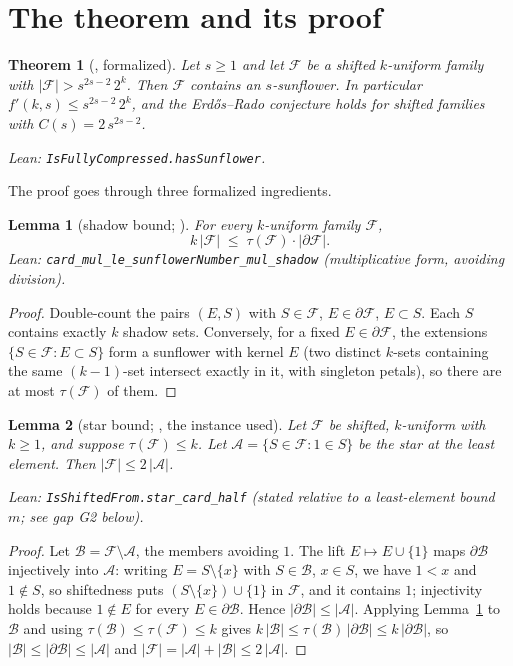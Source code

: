 \documentclass[11pt,a4paper]{article}
\newtheorem{theorem}{Theorem}
\newtheorem{lemma}{Lemma}
\theoremstyle{remark}
\newcommand{\cA}{\mathcal{A}}
\newcommand{\cB}{\mathcal{B}}
\newcommand{\cF}{\mathcal{F}}
\begin{document}
\section{The theorem and its proof}

\begin{theorem}[{\cite[Theorem~1 and Corollary~1]{Mi26}}, formalized]
\label{thm:main}
Let $s\ge 1$ and let $\cF$ be a shifted $k$-uniform family with
$|\cF|>s^{2s-2}\,2^{k}$. Then $\cF$ contains an $s$-sunflower. In
particular $f'(k,s)\le s^{2s-2}\,2^{k}$, and the Erd\H{o}s--Rado
conjecture holds for shifted families with $C(s)=2\,s^{2s-2}$.

\noindent\emph{Lean:} \texttt{IsFullyCompressed.hasSunflower}.
\end{theorem}

The proof goes through three formalized ingredients.

\begin{lemma}[shadow bound; {\cite[Lemma~4]{Mi26}}]\label{lem:shadow}
For every $k$-uniform family $\cF$,
\[
  k\,|\cF|\;\le\;\tau(\cF)\cdot|\partial\cF|.
\]
\emph{Lean:} \texttt{card\_mul\_le\_sunflowerNumber\_mul\_shadow}
(multiplicative form, avoiding division).
\end{lemma}

\begin{proof}
Double-count the pairs $(E,S)$ with $S\in\cF$, $E\in\partial\cF$,
$E\subset S$. Each $S$ contains exactly $k$ shadow sets. Conversely,
for a fixed $E\in\partial\cF$, the extensions
$\{S\in\cF:E\subset S\}$ form a sunflower with kernel $E$ (two distinct
$k$-sets containing the same $(k-1)$-set intersect exactly in it, with
singleton petals), so there are at most $\tau(\cF)$ of them.
\end{proof}

\begin{lemma}[star bound; {\cite[Lemma~5]{Mi26}}, the instance used]
\label{lem:star}
Let $\cF$ be shifted, $k$-uniform with $k\ge1$, and suppose
$\tau(\cF)\le k$. Let $\cA=\{S\in\cF:1\in S\}$ be the star at the least
element. Then $|\cF|\le 2\,|\cA|$.

\noindent\emph{Lean:} \texttt{IsShiftedFrom.star\_card\_half} (stated
relative to a least-element bound $m$; see gap G2 below).
\end{lemma}

\begin{proof}
Let $\cB=\cF\setminus\cA$, the members avoiding $1$. The lift
$E\mapsto E\cup\{1\}$ maps $\partial\cB$ injectively into $\cA$:
writing $E=S\setminus\{x\}$ with $S\in\cB$, $x\in S$, we have $1<x$ and
$1\notin S$, so shiftedness puts $(S\setminus\{x\})\cup\{1\}$ in $\cF$,
and it contains $1$; injectivity holds because $1\notin E$ for every
$E\in\partial\cB$. Hence $|\partial\cB|\le|\cA|$. Applying
Lemma~\ref{lem:shadow} to $\cB$ and using
$\tau(\cB)\le\tau(\cF)\le k$ gives
$k\,|\cB|\le\tau(\cB)\,|\partial\cB|\le k\,|\partial\cB|$, so
$|\cB|\le|\partial\cB|\le|\cA|$ and
$|\cF|=|\cA|+|\cB|\le2\,|\cA|$.
\end{proof}
\end{document}
